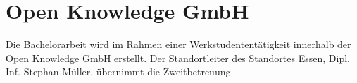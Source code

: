 





\section{Open Knowledge GmbH}


Die Bachelorarbeit wird im Rahmen einer Werkstudententätigkeit innerhalb der Open Knowledge GmbH erstellt. Der Standortleiter des Standortes Essen, Dipl. Inf. Stephan Müller, übernimmt die Zweitbetreuung.

